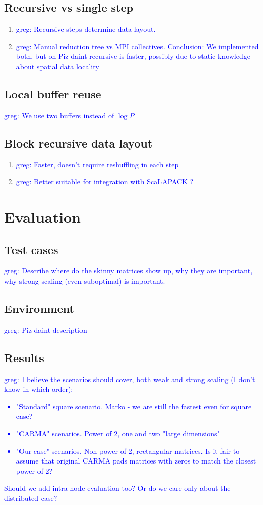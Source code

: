 \documentclass[sigconf]{acmart}
\newcommand\greg[1]{\textcolor{blue}{greg: #1}}
\begin{document}
\subsection{Recursive vs single step}
\begin{enumerate}
	\item \greg{Recursive steps determine data layout.}
	\item \greg{Manual reduction tree vs MPI collectives. Conclusion: We 
	implemented both, but on Piz daint recursive is faster, possibly due to 
	static knowledge about spatial data locality}
\end{enumerate}
\subsection{Local buffer reuse}
\greg{We use two buffers instead of $\log P$}
\subsection{Block recursive data layout}
\begin{enumerate}
	\item \greg{Faster, doesn't require reshuffling in each step}
	\item \greg{Better suitable for integration with ScaLAPACK ?}
\end{enumerate}


\section{Evaluation}
\label{sec:evaluation}
\subsection{Test cases}
\greg{Describe where do the skinny matrices show up, why they are important, 
why strong scaling (even suboptimal) is important.}
\subsection{Environment}
\greg{Piz daint description}
\subsection{Results}
\greg{I believe the scenarios should cover, both weak and strong scaling (I 
don't know in which order):
\begin{itemize}
	\item "Standard" square scenario. Marko - we are still the fastest even for 
	square case?
	\item "CARMA" scenarios. Power of 2, one and two "large dimensions"
	\item "Our case" scenarios. Non power of 2, rectangular matrices. Is it 
	fair to assume that original CARMA pads matrices with zeros to match the 
	closest power of 2?
\end{itemize}
Should we add intra node evaluation too? Or do we care only about the 
distributed case?
}
\end{document}

